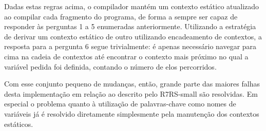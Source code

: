 Dadas estas regras acima, o compilador mantém um contexto estático atualizado
ao compilar cada fragmento do programa, de forma a sempre ser capaz de
responder às perguntas 1 a 5 enumeradas anteriormente. Utilizando a estratégia
de derivar um contexto estático de outro utilizando encadeamento de contextos,
a resposta para a pergunta 6 segue trivialmente: é apenas necessário navegar
para cima na cadeia de contextos até encontrar o contexto mais próximo no qual
a variável pedida foi definida, contando o número de elos percorridos.

Com esse conjunto pequeno de mudanças, então, grande parte das maiores falhas
desta implementação em relação ao descrito pelo \acs{R7RS}-small são
resolvidas.  Em especial o problema quanto à utilização de palavras-chave como
nomes de variáveis já é resolvido diretamente simplesmente pela manutenção dos
contextos estáticos.

